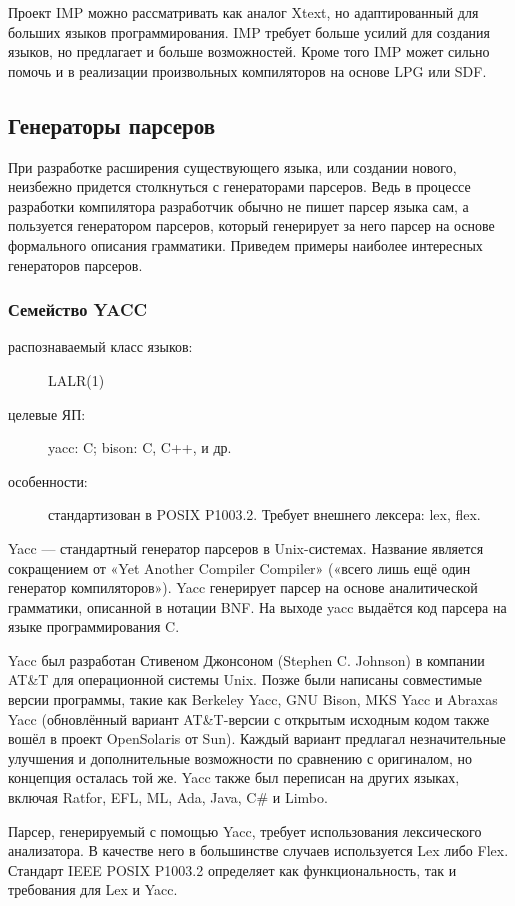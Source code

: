\documentclass[a4paper,12pt,titlepage]{extarticle}
\begin{document}
Проект IMP можно рассматривать как аналог Xtext, но адаптированный для больших
языков программирования. IMP требует больше усилий для создания языков, но
предлагает и больше возможностей. Кроме того IMP может сильно помочь и в
реализации произвольных компиляторов на основе LPG или SDF.

\subsection{Генераторы парсеров}
При разработке расширения существующего языка, или создании нового, неизбежно
придется столкнуться с генераторами парсеров. Ведь в процессе разработки
компилятора разработчик обычно не пишет парсер языка сам, а пользуется
генератором парсеров, который генерирует за него парсер на основе формального
описания грамматики. Приведем примеры наиболее интересных генераторов парсеров.

\subsubsection*{Семейство YACC}
\begin{description}
  \item[распознаваемый класс языков:] LALR(1)
  \item[целевые ЯП:] yacc: C; bison: C, C++, и др.
  \item[особенности:] стандартизован в POSIX P1003.2. Требует внешнего лексера: lex, flex.
\end{description}
Yacc — стандартный генератор парсеров в Unix-системах. Название является
сокращением от «Yet Another Compiler Compiler» («всего лишь ещё один генератор
компиляторов»). Yacc генерирует парсер на основе аналитической грамматики,
описанной в нотации BNF. На выходе yacc выдаётся код парсера на языке
программирования C.

Yacc был разработан Стивеном Джонсоном (Stephen C. Johnson) в компании AT\&T
для операционной системы Unix. Позже были написаны совместимые версии
программы, такие как Berkeley Yacc, GNU Bison, MKS Yacc и Abraxas Yacc
(обновлённый вариант AT\&T-версии с открытым исходным кодом также вошёл в
проект OpenSolaris от Sun). Каждый вариант предлагал незначительные улучшения и
дополнительные возможности по сравнению с оригиналом, но концепция осталась той
же. Yacc также был переписан на других языках, включая Ratfor, EFL, ML, Ada,
Java, C\# и Limbo.

Парсер, генерируемый с помощью Yacc, требует использования лексического
анализатора. В качестве него в большинстве случаев используется Lex либо
Flex. Стандарт IEEE POSIX P1003.2 определяет как функциональность, так и
требования для Lex и Yacc.
\end{document}
